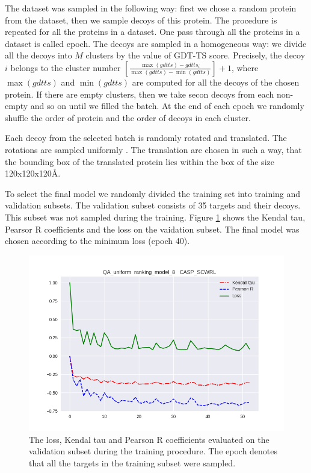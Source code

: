 \documentclass[a4paper,10pt]{article}
\begin{document}
The dataset was sampled in the following way: first we chose a random protein from the dataset, then we sample decoys of this protein. 
The procedure is repeated for all the 
proteins in a dataset. One pass through all the proteins in a dataset is called epoch. 
The decoys are sampled in a homogeneous way: we divide all the decoys into $M$ clusters by the value of GDT-TS score. 
Precisely, the decoy $i$ belongs to the cluster  
number $ \left[ \frac{\max(gdtts) - gdtts_i}{\max(gdtts) - \min(gdtts)} \right] + 1$, where $\max(gdtts)$ and $\min(gdtts)$ 
are computed for all the decoys of 
the chosen protein. If there are empty clusters, then we take secon decoys from each non-empty and so on until we filled the batch. 
At the end of each epoch we randomly
shuffle the order of protein and the order of decoys in each cluster. 

Each decoy from the selected batch is randomly rotated and translated. The rotations are sampled uniformly \cite{}. The translation are chosen
in such a way, that the bounding box of the translated protein lies within the box of the size 120x120x120\AA. 

To select the final model we randomly divided the training set into training and validation subsets. The validation subset consists of 
35 targets and their decoys. This subset was not sampled during the training. 
Figure \ref{Fig:TrainingLoss} shows the Kendal tau, Pearsor R coefficients and the loss on the vaidation subset. 
The final model was chosen according to the minimum loss (epoch 40).
\begin{figure}[H]
    \centering
    \includegraphics[width=\linewidth]{Fig/kendall_validation.png}
    \caption{The loss, Kendal tau and Pearson R coefficients evaluated on the validation subset during the training procedure. The epoch 
    denotes that all the targets in the training subset were sampled.}
    \label{Fig:TrainingLoss}
\end{figure}
\end{document}
